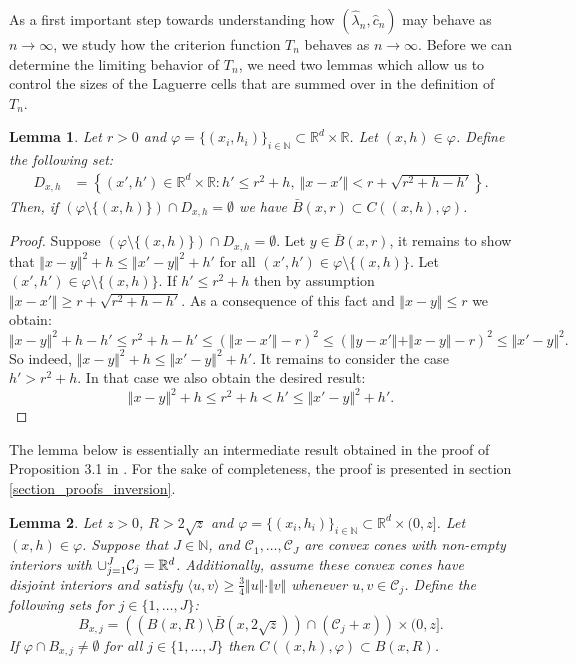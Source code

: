 \documentclass{article}
\newcommand{\NN}{\mathbb{N}}
\newcommand{\RR}{\mathbb{R}}
\theoremstyle{plain}
\newtheorem{lemma}{Lemma}
\theoremstyle{remark}
\theoremstyle{definition}
\begin{document}
As a first important step towards understanding how $(\hat{\lambda}_n, \hat{c}_n)$ may behave as $n \to \infty$, we study how the criterion function $T_n$ behaves as $n \to \infty$. Before we can determine the limiting behavior of $T_n$, we need two lemmas which allow us to control the sizes of the Laguerre cells that are summed over in the definition of $T_n$.

\begin{lemma}\label{ball_in_cell_lemma}
    Let $r >0$ and $\varphi = \{(x_i,h_i)\}_{i \in \NN} \subset \RR^d \times \RR$. Let $(x,h) \in \varphi$. Define the following set:
    \begin{align*}
        D_{x,h} &= \left\{(x',h') \in \RR^d \times \RR: h'\leq r^2 + h, \ \Vert x - x'\Vert < r + \sqrt{r^2 + h - h'}\right\}.
    \end{align*}
    Then, if $(\varphi \setminus \{(x,h)\}) \cap D_{x,h} = \emptyset$ we have $\bar{B}(x,r) \subset C((x,h),\varphi)$.
\end{lemma}

\begin{proof}
    Suppose $(\varphi \setminus \{(x,h)\}) \cap D_{x,h} = \emptyset$. Let $y \in \bar{B}(x,r)$, it remains to show that $\Vert x- y\Vert^2 + h \leq \Vert x' - y\Vert^2 + h'$ for all $(x',h') \in \varphi \setminus \{(x,h)\}$. Let $(x',h') \in \varphi \setminus \{(x,h)\}$. If $h' \leq r^2 + h$ then by assumption $\Vert x - x'\Vert \geq r + \sqrt{r^2 + h - h'}$. As a consequence of this fact and $\Vert x - y \Vert \leq r$ we obtain:
    \[\Vert x - y\Vert^2 +h -h' \leq r^2 + h - h' \leq \left(\Vert x-x' \Vert -r \right)^2 \leq \left(\Vert y-x' \Vert + \Vert x-y \Vert -r \right)^2 \leq \Vert x' - y\Vert^2.\]
    So indeed, $\Vert x- y\Vert^2 + h \leq \Vert x' - y\Vert^2 + h'$. It remains to consider the case $h' > r^2 + h$. In that case we also obtain the desired result:
    \[\Vert x- y\Vert^2 + h \leq r^2 + h < h' \leq \Vert x' - y\Vert^2 + h'.\]
\end{proof}

The lemma below is essentially an intermediate result obtained in the proof of Proposition 3.1 in \cite{Flimmel2020}. For the sake of completeness, the proof is presented in section \ref{section_proofs_inversion}.

\begin{lemma}\label{cell_in_ball_lemma}
    Let $z > 0$, $R > 2\sqrt{z}$ and $\varphi = \{(x_i,h_i)\}_{i \in \NN} \subset \RR^d \times (0,z]$. Let $(x,h) \in \varphi$. Suppose that $J \in \NN$, and $\mathcal{C}_1,\dots,\mathcal{C}_J$ are convex cones with non-empty interiors with $\smash{\cup_{j=1}^J} \mathcal{C}_j = \RR^d$. Additionally, assume these convex cones have disjoint interiors and satisfy $\langle u,v\rangle \geq \frac{3}{4}\Vert u \Vert \cdot \Vert v\Vert$ whenever $u,v \in \mathcal{C}_j$. Define the following sets for $j \in \{1,\dots,J\}$:
    \[B_{x,j} = \left(\left(B(x,R)\setminus\bar{B}(x,2\sqrt{z})\right) \cap (\mathcal{C}_j + x)\right) \times (0,z].\]
    If $\varphi \cap B_{x,j} \neq \emptyset$ for all $j \in \{1,\dots,J\}$ then $C((x,h),\varphi) \subset B(x,R)$.
\end{lemma}
\end{document}
